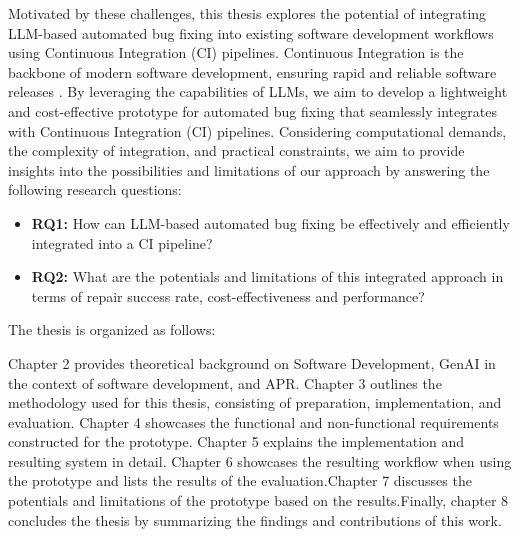 Motivated by these challenges, this thesis explores the potential of integrating LLM-based automated bug fixing into existing software development workflows using Continuous Integration (CI) pipelines. Continuous Integration is the backbone of modern software development, ensuring rapid and reliable software releases \cite{ugwuezeContinuousIntegrationDeployment2024}. By leveraging the capabilities of \acp{LLM}, we aim to develop a lightweight and cost-effective prototype for automated bug fixing that seamlessly integrates with Continuous Integration (CI) pipelines. Considering computational demands, the complexity of integration, and practical constraints, we aim to provide insights into the possibilities and limitations of our approach by answering the following research questions:

\vspace{1em}

\begin{itemize}
    \item \textbf{RQ1:} How can LLM-based automated bug fixing be effectively and efficiently integrated into a CI pipeline?
    \item \textbf{RQ2:} What are the potentials and limitations of this integrated approach in terms of repair success rate, cost-effectiveness and performance?
\end{itemize}

The thesis is organized as follows:

Chapter 2 provides theoretical background on Software Development, \ac{GenAI} in the context of software development, and \ac{APR}. Chapter 3 outlines the methodology used for this thesis, consisting of preparation, implementation, and evaluation. Chapter 4 showcases the functional and non-functional requirements constructed for the prototype.
Chapter 5 explains the implementation and resulting system in detail. Chapter 6 showcases the resulting workflow when using the prototype and lists the results of the evaluation.Chapter 7 discusses the potentials and limitations of the prototype based on the results.Finally, chapter 8 concludes the thesis by summarizing the findings and contributions of this work.
